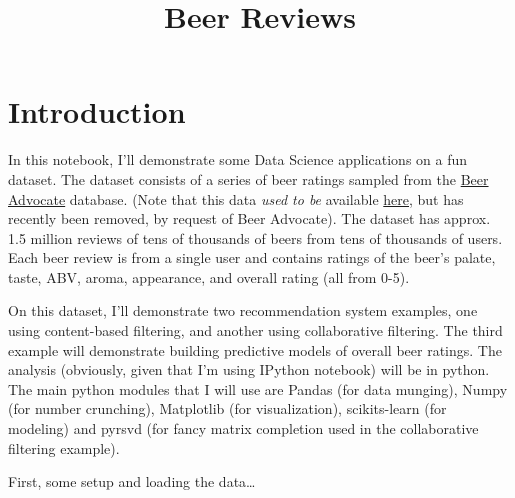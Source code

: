 \documentclass{article}
\title{Beer Reviews}
\begin{document}
    
    
    \maketitle
    
    

    
    \section{Introduction}\label{introduction}

In this notebook, I'll demonstrate some Data Science applications on a
fun dataset. The dataset consists of a series of beer ratings sampled
from the \href{http://www.beeradvocate.com}{Beer Advocate} database.
(Note that this data \emph{used to be} available
\href{http://snap.stanford.edu/data/web-BeerAdvocate.html}{here}, but
has recently been removed, by request of Beer Advocate). The dataset has
approx. 1.5 million reviews of tens of thousands of beers from tens of
thousands of users. Each beer review is from a single user and contains
ratings of the beer's palate, taste, ABV, aroma, appearance, and overall
rating (all from 0-5).

On this dataset, I'll demonstrate two recommendation system examples,
one using content-based filtering, and another using collaborative
filtering. The third example will demonstrate building predictive models
of overall beer ratings. The analysis (obviously, given that I'm using
IPython notebook) will be in python. The main python modules that I will
use are Pandas (for data munging), Numpy (for number crunching),
Matplotlib (for visualization), scikits-learn (for modeling) and pyrsvd
(for fancy matrix completion used in the collaborative filtering
example).

First, some setup and loading the data\ldots{}
\end{document}
